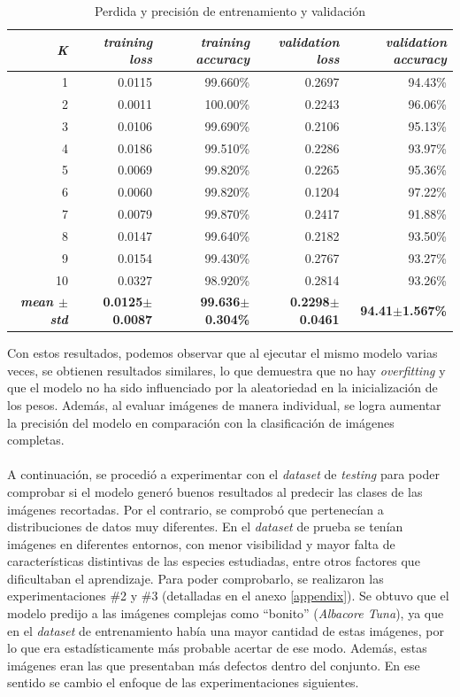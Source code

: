 \begin{table}[h!]
\footnotesize
\centering
\begin{tabular}{|r|r|r|r|r|}
\hline
\textit{K} & \textit{training loss} & \textit{training accuracy} & \textit{validation loss} & \textit{validation accuracy} \\ \hline
1    & 0.0115      & 99.660\%    & 0.2697    & 94.43\%  \\ \hline
2    & 0.0011      & 100.00\%   & 0.2243    & 96.06\%  \\ \hline
3    & 0.0106      & 99.690\%    & 0.2106    & 95.13\%  \\ \hline
4    & 0.0186      & 99.510\%    & 0.2286    & 93.97\%  \\ \hline
5    & 0.0069      & 99.820\%    & 0.2265    & 95.36\%  \\ \hline
6    & 0.0060      & 99.820\%    & 0.1204    & 97.22\%  \\ \hline
7    & 0.0079      & 99.870\%    & 0.2417    & 91.88\%  \\ \hline
8    & 0.0147      & 99.640\%    & 0.2182    & 93.50\%  \\ \hline
9    & 0.0154      & 99.430\%    & 0.2767    & 93.27\%  \\ \hline
10   & 0.0327      & 98.920\%    & 0.2814    & 93.26\%  \\ \hline
\textbf{\textit{mean $\pm$ std}}     & \textbf{0.0125$\pm$0.0087}      & \textbf{99.636$\pm$0.304\%}    & \textbf{0.2298$\pm$0.0461}    & \textbf{94.41$\pm$1.567\%}  \\ \hline
\end{tabular}
\caption{Perdida y precisión de entrenamiento y validación}
\label{table:KFolds1}
\end{table}
Con estos resultados, podemos observar que al ejecutar el mismo modelo varias veces, se obtienen resultados similares, lo que demuestra que no hay \textit{overfitting} y que el modelo no ha sido influenciado por la aleatoriedad en la inicialización de los pesos. Además, al evaluar imágenes de manera individual, se logra aumentar la precisión del modelo en comparación con la clasificación de imágenes completas.
\\\\
A continuación, se procedió a experimentar con el \textit{dataset} de \textit{testing} para poder comprobar si el modelo generó buenos resultados al predecir las clases de las imágenes recortadas. Por el contrario, se comprobó que pertenecían a distribuciones de datos muy diferentes. En el \textit{dataset} de prueba se tenían imágenes en diferentes entornos, con menor visibilidad y mayor falta de características distintivas de las especies estudiadas, entre otros factores que dificultaban el aprendizaje. Para poder comprobarlo, se realizaron las experimentaciones \#2 y \#3 (detalladas en el anexo \ref{appendix}). Se obtuvo que el modelo predijo a las imágenes complejas como ``bonito'' (\textit{Albacore Tuna}), ya que en el \textit{dataset} de entrenamiento había una mayor cantidad de estas imágenes, por lo que era estadísticamente más probable acertar de ese modo. Además, estas imágenes eran las que presentaban más defectos dentro del conjunto. En ese sentido se cambio el enfoque de las experimentaciones siguientes.
